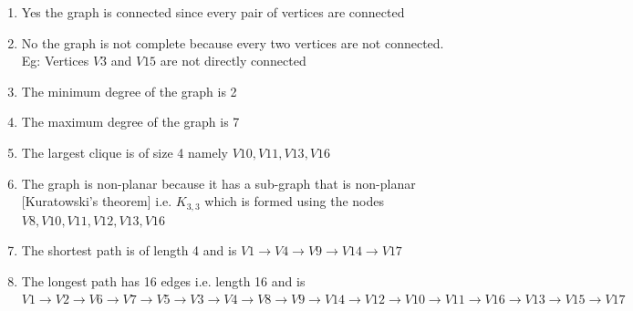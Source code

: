 \documentclass[10pt]{article}
\newenvironment{solution}[2][Solution]{ \begin{trivlist}
\item[\hskip \labelsep {\bfseries #1}]}{\end{trivlist}}
\newenvironment{problem}[2][Problem]{\begin{trivlist}
\item[\hskip \labelsep {\bfseries #1}\hskip \labelsep {\bfseries #2.}]}{\end{trivlist}}
\begin{document}
\begin{solution}{4}
\item[]
\begin{enumerate}[label=(\alph*)]
    \parskip=0in
    \parsep=0in
    \itemsep=0.1in
    \item Yes the graph is connected since every pair of vertices are connected
    \item No the graph is not complete because every two vertices are not connected. Eg: Vertices $V3$ and $V15$ are not directly connected
    \item The minimum degree of the graph is 2
    \item The maximum degree of the graph is 7
    \item The largest clique is of size 4 namely $V10, V11, V13, V16$
    \item The graph is non-planar because it has a sub-graph that is non-planar [Kuratowski’s theorem] i.e. $K_{3,3}$ which is formed using the nodes $V8,V10,V11,V12,V13,V16$
    \item The shortest path is of length 4 and is $V1 \rightarrow V4 \rightarrow V9 \rightarrow V{14}
    \rightarrow V{17}$
    \item The longest path has 16 edges i.e. length 16 and is $V1\rightarrow V2\rightarrow V6\rightarrow V7\rightarrow V5\rightarrow V3\rightarrow V4\rightarrow V8\rightarrow V9\rightarrow V14\rightarrow V12\rightarrow V10\rightarrow V11\rightarrow V16\rightarrow V13\rightarrow V15\rightarrow V17$
\end{enumerate}
\end{solution}

\vskip 0.5in
\pagebreak


\end{document}
